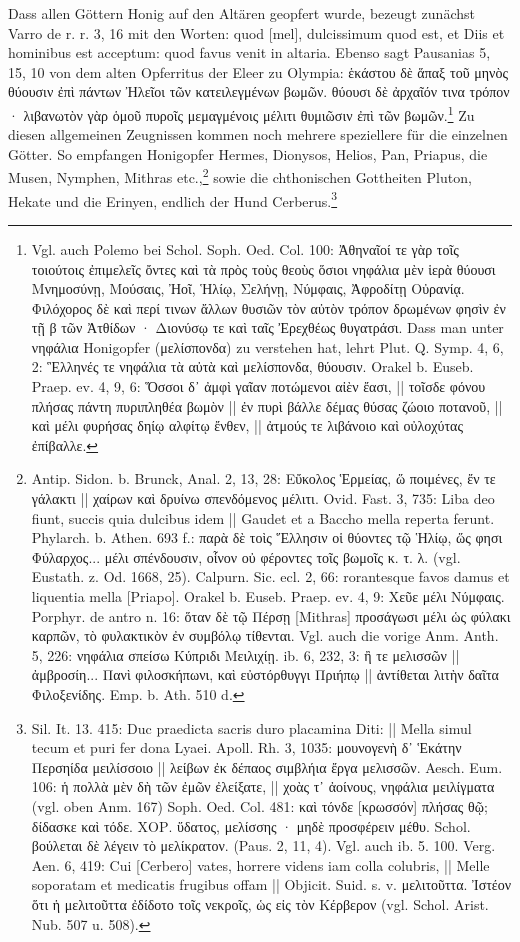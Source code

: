 \documentclass[a4paper, 11pt, oneside]{article}
\begin{document}
Dass allen Göttern Honig auf den Altären geopfert wurde, bezeugt zunächst Varro de r. r. 3, 16 mit den Worten: quod [mel], dulcissimum quod est, et Diis et hominibus est acceptum: quod favus venit in altaria. Ebenso sagt Pausanias 5, 15, 10 von dem alten Opferritus der Eleer zu Olympia: ἑκάστου δὲ ἅπαξ τοῦ μηνὸς θύουσιν ἐπὶ πάντων Ἠλεῖοι τῶν κατειλεγμένων βωμῶν. θύουσι δὲ ἀρχαῖόν τινα τρόπον · λιβανωτὸν γὰρ ὁμοῦ πυροῖς μεμαγμένοις μέλιτι θυμιῶσιν ἐπὶ τῶν βωμῶν.\footnote{Vgl. auch Polemo bei Schol. Soph. Oed. Col. 100: Ἀθηναῖοί τε γὰρ τοῖς τοιούτοις ἐπιμελεῖς ὄντες καὶ τὰ πρὸς τοὺς θεοὺς ὅσιοι νηφάλια μὲν ἱερὰ θύουσι Μνημοσύνῃ, Μούσαις, Ἠοῖ, Ἡλίῳ, Σελήνῃ, Νύμφαις, Ἀφροδίτῃ Οὐρανίᾳ. Φιλόχορος δὲ καὶ περί τινων ἄλλων θυσιῶν τὸν αὐτὸν τρόπον δρωμένων φησὶν ἐν τῇ β τῶν Ἀτθίδων · Διονύσῳ τε καὶ ταῖς Ἐρεχθέως θυγατράσι. Dass man unter νηφάλια Honigopfer (μελίσπονδα) zu verstehen hat, lehrt Plut. Q. Symp. 4, 6, 2: Ἓλληνές τε νηφάλια τὰ αὐτὰ καὶ μελίσπονδα, θύουσιν. Orakel b. Euseb. Praep. ev. 4, 9, 6: Ὅσσοι δ᾽ ἀμφὶ γαῖαν ποτώμενοι αἰὲν ἔασι, || τοῖσδε φόνου πλήσας πάντη πυριπληθέα βωμὸν || ἐν πυρὶ βάλλε δέμας θύσας ζώοιο ποτανοῦ, || καὶ μέλι φυρήσας δηίῳ αλφίτῳ ἔνθεν, || ἀτμούς τε λιβάνοιο καὶ οὐλοχύτας ἐπίβαλλε.} Zu diesen allgemeinen Zeugnissen kommen noch mehrere speziellere für die einzelnen Götter. So empfangen Honigopfer Hermes, Dionysos, Helios, Pan, Priapus, die Musen, Nymphen, Mithras etc.,\footnote{Antip. Sidon. b. Brunck, Anal. 2, 13, 28: Εὔκολος Ἑρμείας, ὥ ποιμένες, ἔν τε γάλακτι || χαίρων καὶ δρυίνω σπενδόμενος μέλιτι. Ovid. Fast. 3, 735: Liba deo fiunt, succis quia dulcibus idem || Gaudet et a Baccho mella reperta ferunt. Phylarch. b. Athen. 693 f.: παρὰ δὲ τοὶς Ἕλλησιν οἱ θύοντες τῷ Ἡλίῳ, ὥς φησι Φύλαρχος... μέλι σπένδουσιν, οἷνον οὐ φέροντες τοῖς βωμοῖς κ. τ. λ. (vgl. Eustath. z. Od. 1668, 25). Calpurn. Sic. ecl. 2, 66: rorantesque favos damus et liquentia mella [Priapo]. Orakel b. Euseb. Praep. ev. 4, 9: Χεῦε μέλι Νύμφαις. Porphyr. de antro n. 16: ὅταν δὲ τῷ Πέρσῃ [Mithras] προσάγωσι μέλι ὡς φύλακι καρπῶν, τὸ φυλακτικὸν ἐν συμβόλῳ τίθενται. Vgl. auch die vorige Anm. Anth. 5, 226: νηφάλια σπείσω Κύπριδι Μειλιχίῃ. ib. 6, 232, 3: ἢ τε μελισσῶν || ἀμβροσίη... Πανὶ φιλοσκήπωνι, καὶ εὐστόρθυγγι Πριήπῳ || ἀντίθεται λιτὴν δαῖτα Φιλοξενίδης. Emp. b. Ath. 510 d.} sowie die chthonischen Gottheiten Pluton, Hekate und die Erinyen, endlich der Hund Cerberus.\footnote{Sil. It. 13. 415: Duc praedicta sacris duro placamina Diti: || Mella simul tecum et puri fer dona Lyaei. Apoll. Rh. 3, 1035: μουνογενὴ δ᾽ Ἑκάτην Περσηίδα μειλίσσοιο || λείβων ἐκ δέπαος σιμβλήια ἔργα μελισσῶν. Aesch. Eum. 106: ἡ πολλὰ μὲν δὴ τῶν ἐμῶν ἐλείξατε, || χοὰς τ᾽ ἀοίνους, νηφάλια μειλίγματα (vgl. oben Anm. 167) Soph. Oed. Col. 481: καὶ τόνδε [κρωσσόν] πλήσας θῷ; δίδασκε καὶ τόδε. ΧΟΡ. ὕδατος, μελίσσης · μηδὲ προσφέρειν μέθυ. Schol. βούλεται δὲ λέγειν τὸ μελίκρατον. (Paus. 2, 11, 4). Vgl. auch ib. 5. 100. Verg. Aen. 6, 419: Cui [Cerbero] vates, horrere videns iam colla colubris, || Melle soporatam et medicatis frugibus offam || Objicit. Suid. s. v. μελιτοῦττα. Ἰστέον ὅτι ἡ μελιτοῦττα ἐδίδοτο τοῖς νεκροῖς, ὡς εἰς τὸν Κέρβερον (vgl. Schol. Arist. Nub. 507 u. 508).}
\end{document}
